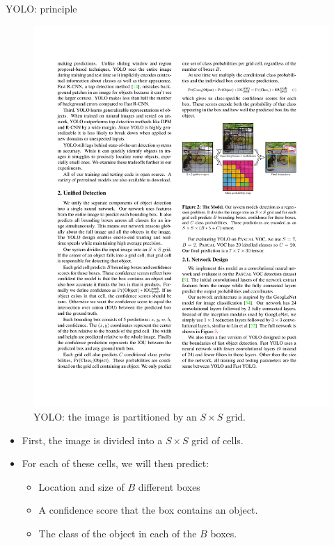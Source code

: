 \documentclass[xcolor=pdftex,dvipsnames,table]{beamer}
\begin{document}
\begin{frame}{YOLO: principle}
\begin{figure}[htb]
   \centering
   \includegraphics[height=0.4\textheight]{../graphics/YOLO_1.pdf}
   \caption{YOLO: the image is partitioned by an $S \times S$ grid.}
\end{figure}
\begin{itemize}
   \item First, the image is divided into a $S \times S$ grid of cells. 
   \item For each of these cells, we will then predict:
   \begin{itemize}
      \item Location and size of $B$ different boxes 
      \item A confidence score that the box contains an object. 
      \item The class of the object in each of the $B$ boxes. 
   \end{itemize}
\end{itemize}
\end{frame}
\end{document}
